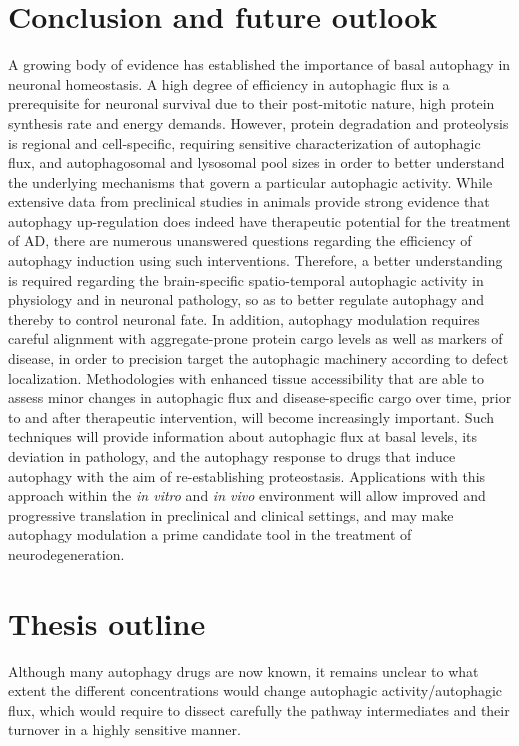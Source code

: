 \section{Conclusion and future outlook}
A growing body of evidence has established the importance of basal autophagy in neuronal homeostasis. A high degree of efficiency in autophagic flux is a prerequisite for neuronal survival due to their post-mitotic nature, high protein synthesis rate and energy demands. However, protein degradation and proteolysis is regional and cell-specific, requiring sensitive characterization of autophagic flux, and autophagosomal and lysosomal pool sizes in order to better understand the underlying mechanisms that govern a particular autophagic activity. While extensive data from preclinical studies in animals provide strong evidence that autophagy up-regulation does indeed have therapeutic potential for the treatment of AD, there are numerous unanswered questions regarding the efficiency of autophagy induction using such interventions. Therefore, a better understanding is required regarding the brain-specific spatio-temporal autophagic activity in physiology and in neuronal pathology, so as to better regulate autophagy and thereby to control neuronal fate. In addition, autophagy modulation requires careful alignment with aggregate-prone protein cargo levels as well as markers of disease, in order to precision target the autophagic machinery according to defect localization. Methodologies with enhanced tissue accessibility that are able to assess minor changes in autophagic flux and disease-specific cargo over time, prior to and after therapeutic intervention, will become increasingly important. Such techniques will provide information about autophagic flux at basal levels, its deviation in pathology, and the autophagy response to drugs that induce autophagy with the aim of re-establishing proteostasis. Applications with this approach within the \textit{in vitro} and \textit{in vivo} environment will allow improved and progressive translation in preclinical and clinical settings, and may make autophagy modulation a prime candidate tool in the treatment of neurodegeneration. 

\section{Thesis outline}
Although many autophagy drugs are now known, it remains unclear to what extent the different concentrations would change autophagic activity/autophagic flux, which would require to dissect carefully the pathway intermediates and their turnover in a highly sensitive manner.

